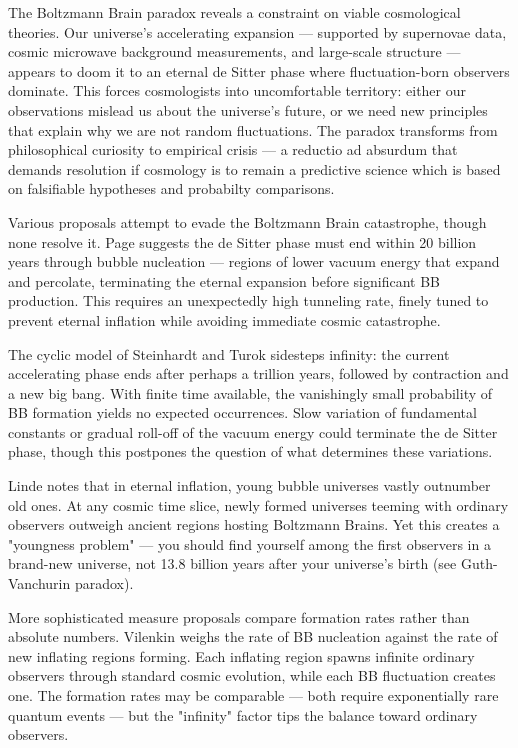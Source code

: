 The Boltzmann Brain paradox reveals a constraint on viable cosmological theories. Our universe's accelerating expansion — supported by supernovae data, cosmic microwave background measurements, and large-scale structure — appears to doom it to an eternal de Sitter phase where fluctuation-born observers dominate. This forces cosmologists into uncomfortable territory: either our observations mislead us about the universe's future, or we need new principles that explain why we are not random fluctuations. The paradox transforms from philosophical curiosity to empirical crisis — a reductio ad absurdum that demands resolution if cosmology is to remain a predictive science which is based on falsifiable hypotheses and probabilty comparisons.

Various proposals attempt to evade the Boltzmann Brain catastrophe, though none resolve it. Page suggests the de Sitter phase must end within 20 billion years through bubble nucleation — regions of lower vacuum energy that expand and percolate, terminating the eternal expansion before significant BB production. This requires an unexpectedly high tunneling rate, finely tuned to prevent eternal inflation while avoiding immediate cosmic catastrophe.

The cyclic model of Steinhardt and Turok sidesteps infinity: the current accelerating phase ends after perhaps a trillion years, followed by contraction and a new big bang. With finite time available, the vanishingly small probability of BB formation yields no expected occurrences. Slow variation of fundamental constants or gradual roll-off of the vacuum energy could terminate the de Sitter phase, though this postpones the question of what determines these variations.

Linde notes that in eternal inflation, young bubble universes vastly outnumber old ones. At any cosmic time slice, newly formed universes teeming with ordinary observers outweigh ancient regions hosting Boltzmann Brains. Yet this creates a "youngness problem" — you should find yourself among the first observers in a brand-new universe, not 13.8 billion years after your universe's birth (see Guth-Vanchurin paradox).

More sophisticated measure proposals compare formation rates rather than absolute numbers. Vilenkin weighs the rate of BB nucleation against the rate of new inflating regions forming. Each inflating region spawns infinite ordinary observers through standard cosmic evolution, while each BB fluctuation creates one. The formation rates may be comparable — both require exponentially rare quantum events — but the "infinity" factor tips the balance toward ordinary observers.

